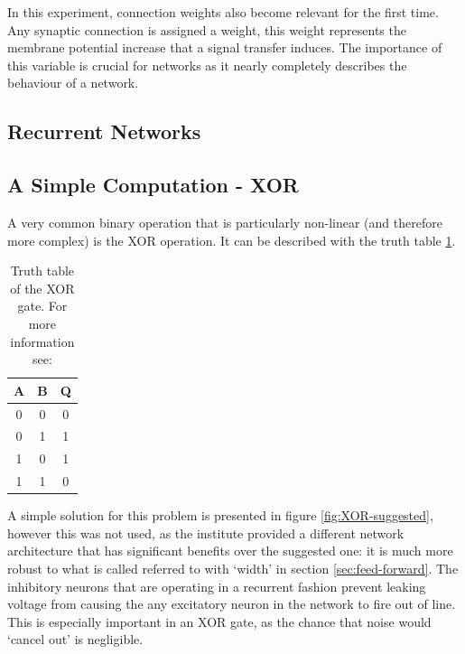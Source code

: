 \documentclass[10pt,a4paper]{article}
\begin{document}
In this experiment, connection weights also become relevant for the first time.
Any synaptic connection is assigned a weight, this weight represents the
membrane potential increase that a signal transfer induces. The importance of
this variable is crucial for networks as it nearly completely describes the
behaviour of a network.

\subsection{Recurrent Networks}

\subsection{A Simple Computation - XOR}
A very common binary operation that is particularly non-linear (and therefore
more complex) is the XOR operation. It can be described with the truth table
\ref{tab:XOR}.

\begin{table}[ht]
    \centering
    \begin{tabular}{c | c | c}
        A & B & Q \\ \hline
        0 & 0 & 0 \\
        0 & 1 & 1 \\
        1 & 0 & 1 \\
        1 & 1 & 0
    \end{tabular}
    \caption{Truth table of the XOR gate. For more information see:
    \cite{horowitz_hill_2020}}
    \label{tab:XOR}
\end{table}

A simple solution for this problem is presented in figure
\ref{fig:XOR-suggested}, however this was not used, as the institute provided a
different network architecture that has significant benefits over the suggested
one: it is much more robust to what is called referred to with `width' in
section \ref{sec:feed-forward}. The inhibitory neurons that are operating in a
recurrent fashion prevent leaking voltage from causing the any excitatory neuron
in the network to fire out of line. This is especially important in an XOR gate,
as the chance that noise would `cancel out' is negligible.
\end{document}
